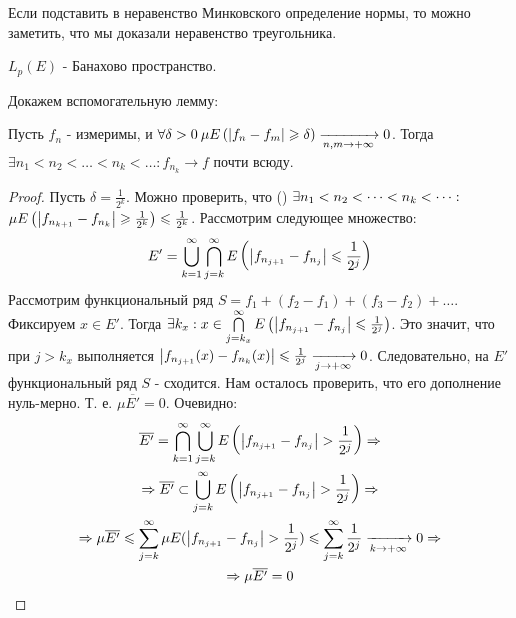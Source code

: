 Если подставить в неравенство Минковского определение нормы, то можно заметить, что мы доказали неравенство треугольника.

\begin{theorem}
	$L_p(E) $ - Банахово пространство.
\end{theorem}

Докажем вспомогательную лемму:

\begin{lemma}
	Пусть $f_n$ - измеримы, и $\forall\delta > 0\: \mu E\left(\left|f_n - f_m\right| \geqslant \delta\right) \xrightarrow[n,m \rightarrow +\infty]{} 0$.
	Тогда $\exists n_1 < n_2 < \dots < n_k < \dots : f_{n_k} \rightarrow f$ почти всюду.
\end{lemma}

\begin{proof}
	Пусть $\delta = \frac{1}{2^k}$. Можно проверить, что (\todo) 
	$\exists n_1 < n_2 < \dots < n_k < \dots: \\$
	$\mu E\left(\left|f_{n_{k + 1}} - f_{n_k}\right| \geqslant \frac{1}{2^k}\right) \leqslant \frac{1}{2^k}$.
	Рассмотрим следующее множество:
	\begin{gather*}
		E' = \bigcup\limits_{k = 1}^{\infty}\bigcap\limits_{j = k}^{\infty} E\left(\left|f_{n_{j + 1}} - f_{n_j}\right| \leqslant \frac{1}{2^j} \right)
	\end{gather*}
	Рассмотрим функциональный ряд $S = f_1 + (f_2 - f_1) + (f_3 - f_2) + \dots$. Фиксируем $x \in E'$. Тогда 
	$\\ \exists k_x : x \in \bigcap\limits_{j = k_x}^{\infty} E\left(\left|f_{n_{j + 1}} - f_{n_j}\right| \leqslant \frac{1}{2^j} \right)$.
	Это значит, что при $j > k_x$ выполняется $\left|f_{n_{j + 1}}(x) - f_{n_k}(x)\right| \leqslant \frac{1}{2^j} \xrightarrow[j \rightarrow +\infty]{} 0$.
	Следовательно, на $E'$ функциональный ряд $S$ - сходится. 
	Нам осталось проверить, что его дополнение нуль-мерно.
	Т. е. $\mu \overline{E'} = 0$. Очевидно:
	\begin{gather*}
		\overline{E'} = \bigcap\limits_{k = 1}^{\infty}\bigcup\limits_{j = k}^{\infty} E\left(\left|f_{n_{j + 1}} - f_{n_j}\right| > \frac{1}{2^j} \right) \Rightarrow \\
		\Rightarrow \overline{E'} \subset \bigcup\limits_{j = k}^{\infty} E\left(\left|f_{n_{j + 1}} - f_{n_j}\right| > \frac{1}{2^j} \right) \Rightarrow \\
		\Rightarrow \mu \overline{E'} \leqslant \sum\limits_{j = k}^{\infty} \mu E(\left|f_{n_{j + 1}} - f_{n_j}\right| > \frac{1}{2^j}) \leqslant 
		\sum\limits_{j = k}^{\infty} \frac{1}{2^j} \xrightarrow[k \rightarrow +\infty]{} 0 \Rightarrow \\
		\Rightarrow \mu \overline{E'} = 0
	\end{gather*}
\end{proof}

